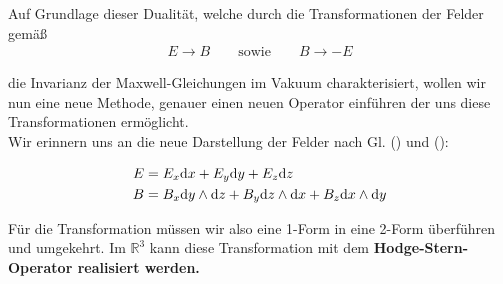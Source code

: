 Auf Grundlage dieser Dualität, welche durch die Transformationen der Felder gemäß
\begin{align*}
E \rightarrow B \qquad \text{sowie} \qquad B \rightarrow -E
\end{align*}

die Invarianz der Maxwell-Gleichungen im Vakuum charakterisiert, wollen wir nun eine neue Methode, genauer einen neuen Operator einführen der uns diese Transformationen ermöglicht. \\
Wir erinnern uns an die neue Darstellung der Felder nach Gl. () und ():

\begin{align*}
E &= E_x \dd x +E_y \dd y + E_z \dd z   \\
B &= B_x \dd y \wedge \dd z + B_y \dd z \wedge \dd x + B_z \dd x \wedge \dd y 
\end{align*}

Für die Transformation müssen wir also eine 1-Form in eine 2-Form überführen und umgekehrt. Im $\mathbb{R}^3$ kann diese Transformation mit dem \bfseries Hodge-Stern-Operator \normalfont realisiert werden.
